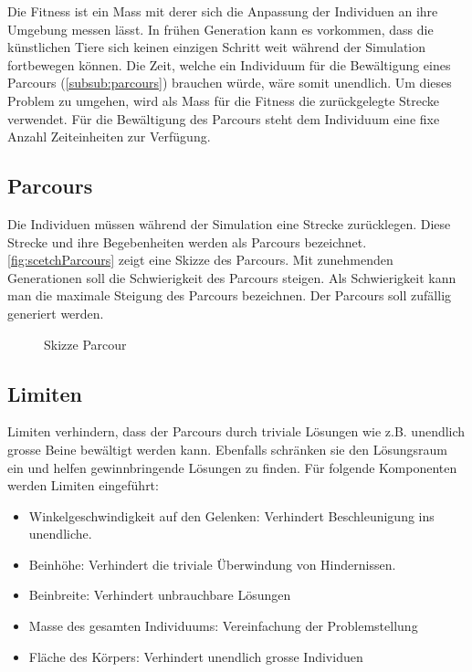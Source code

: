       Die Fitness ist ein Mass mit derer sich die Anpassung der Individuen an ihre Umgebung messen lässt.
      In frühen Generation kann es vorkommen, dass die künstlichen Tiere sich keinen einzigen Schritt weit während der Simulation
      fortbewegen können. Die Zeit, welche ein Individuum für die Bewältigung eines Parcours (\vref{subsub:parcours}) brauchen würde, wäre somit unendlich.
      Um dieses Problem zu umgehen, wird als Mass für die Fitness die zurückgelegte Strecke verwendet.
      Für die Bewältigung des Parcours steht dem Individuum eine fixe Anzahl Zeiteinheiten zur Verfügung.

    \subsection{Parcours\label{subsub:parcours}}

      Die Individuen müssen während der Simulation eine Strecke zurücklegen.
      Diese Strecke und ihre Begebenheiten werden als Parcours bezeichnet.
      \vref{fig:scetchParcours} zeigt eine Skizze des Parcours.
      Mit zunehmenden Generationen soll die Schwierigkeit des Parcours steigen.
      Als Schwierigkeit kann man die maximale Steigung des Parcours bezeichnen.
      Der Parcours soll zufällig generiert werden.

      \begin{figure}[H]
        
        \caption{Skizze Parcour\label{fig:scetchParcours}}
      \end{figure}

    \subsection{Limiten\label{sub:IntroReqLimit}}

      Limiten verhindern, dass der Parcours durch triviale Lösungen wie z.B. unendlich grosse Beine bewältigt werden kann.
      Ebenfalls schränken sie den Lösungsraum ein und helfen gewinnbringende Lösungen zu finden.
      Für folgende Komponenten werden Limiten eingeführt:
      \begin{itemize}
        \item Winkelgeschwindigkeit auf den Gelenken: Verhindert Beschleunigung ins unendliche.
        \item Beinhöhe: Verhindert die triviale Überwindung von Hindernissen.
        \item Beinbreite: Verhindert unbrauchbare Lösungen
        \item Masse des gesamten Individuums: Vereinfachung der Problemstellung
        \item Fläche des Körpers: Verhindert unendlich grosse Individuen
      \end{itemize}

